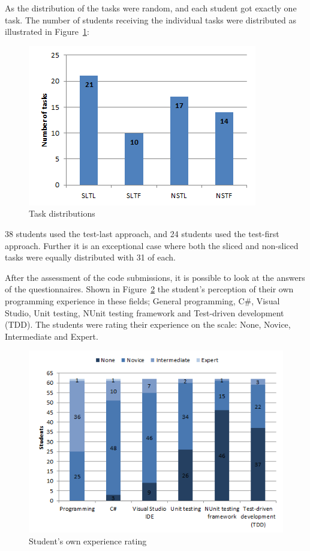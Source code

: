 \documentclass{sig-alternate-05-2015}
\begin{document}
As the distribution of the tasks were random, and each student got exactly one task. The number of students receiving the individual tasks were distributed as illustrated in Figure~\ref{fig:Task distributions}:

\begin{figure}[!ht]
	\centering
	\includegraphics[width=1\linewidth]{img02}
	\caption{Task distributions}
	\label{fig:Task distributions}
\end{figure}

38 students used the test-last approach, and 24 students used the test-first approach. Further it is an exceptional case where both the sliced and non-sliced tasks were equally distributed with 31 of each.

After the assessment of the code submissions, it is possible to look at the answers of the questionnaires. Shown in Figure~\ref{fig:Student's own experience rating} the student's perception of their own programming experience in these fields; General programming, C{\#}, Visual Studio, Unit testing, NUnit testing framework and Test-driven development (TDD).
The students were rating their experience on the scale: None, Novice, Intermediate and Expert.

\begin{figure}[!ht]
	\centering
	\includegraphics[width=1\linewidth]{img03}
	\caption{Student's own experience rating}
	\label{fig:Student's own experience rating}
\end{figure}
\end{document}
